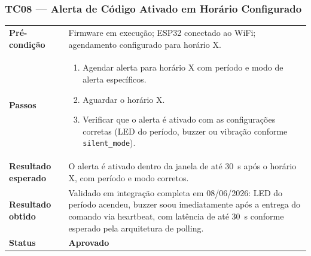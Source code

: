 \documentclass[12pt,a4paper]{article}
\newcommand{\lightrule}{\arrayrulecolor{gray!35}\midrule\arrayrulecolor{black}}
\newcommand{\aprovado}{\textcolor{green!60!black}{\textbf{Aprovado}}}
\begin{document}
\subsubsection{TC08 — Alerta de Código Ativado em Horário Configurado}
\begin{table}[H]\small\setlength{\tabcolsep}{6pt}\renewcommand{\arraystretch}{1.3}
\begin{tabularx}{\textwidth}{>{\bfseries}p{4cm} X}
\toprule
Pré-condição & Firmware em execução; ESP32 conectado ao WiFi; agendamento configurado para horário X. \\
\lightrule
Passos &
\begin{enumerate}[nosep,leftmargin=*]
  \item Agendar alerta para horário X com período e modo de alerta específicos.
  \item Aguardar o horário X.
  \item Verificar que o alerta é ativado com as configurações corretas (LED do período, buzzer ou vibração conforme \texttt{silent\_mode}).
\end{enumerate} \\
\lightrule
Resultado esperado & O alerta é ativado dentro da janela de até 30~s após o horário X, com período e modo corretos. \\
\lightrule
Resultado obtido & Validado em integração completa em 08/06/2026: LED do período acendeu, buzzer soou imediatamente após a entrega do comando via heartbeat, com latência de até 30~s conforme esperado pela arquitetura de polling. \\
\lightrule
Status & \aprovado \\
\bottomrule
\end{tabularx}\end{table}
\end{document}
